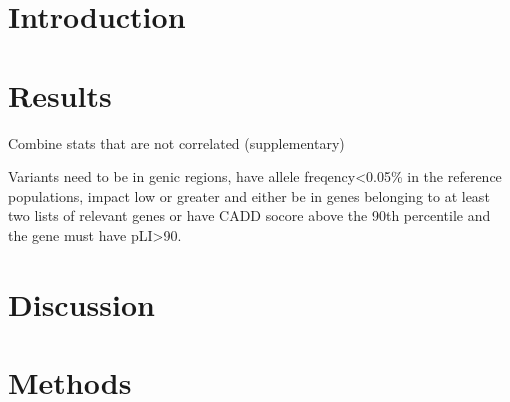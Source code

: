 \documentclass{article}
\title{} %
\author{}
\begin{document}
\maketitle

\begin{abstract}


\end{abstract}

\section{Introduction}

\section{Results}

Combine stats that are not correlated (supplementary)


Variants need to be in genic regions, have allele freqency<0.05\% in the reference populations, impact low or greater and either be in genes belonging to at least two lists of relevant genes or have CADD socore above the 90th percentile and the gene must have pLI>90. 



\section{Discussion}


\section{Methods}
\end{document}
